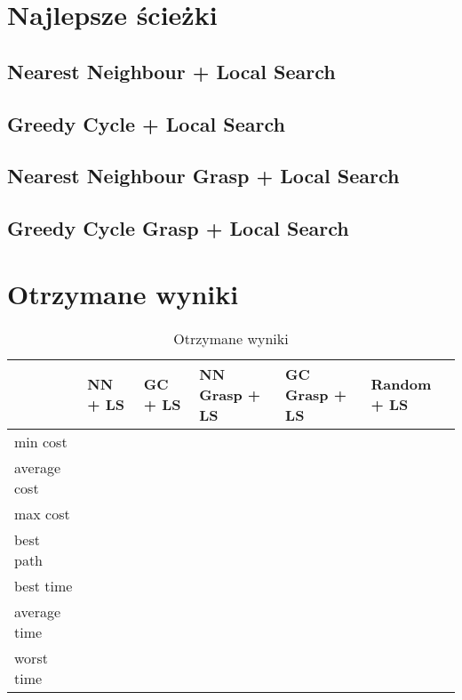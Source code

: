 \documentclass[a4paper 10pt]{article}
\begin{document}
\section{Najlepsze ścieżki}
\subsection{Nearest Neighbour + Local Search}

\subsection{Greedy Cycle + Local Search}

\subsection{Nearest Neighbour Grasp + Local Search}

\subsection{Greedy Cycle Grasp + Local Search}

\section{Otrzymane wyniki}

\begin{table}[H]
\centering
\caption{Otrzymane wyniki}
\label{my-label}
\begin{tabular}{|l|l|l|l|l|l|}
\hline
             & NN + LS & GC + LS & NN Grasp + LS & GC Grasp + LS & Random + LS \\ \hline
min cost     &         &         &               &               &             \\ \hline
average cost &         &         &               &               &             \\ \hline
max cost     &         &         &               &               &             \\ \hline
best path    &         &         &               &               &             \\ \hline
best time    &         &         &               &               &             \\ \hline
average time &         &         &               &               &             \\ \hline
worst time   &         &         &               &               &             \\ \hline
\end{tabular}
\end{table}
\end{document}
